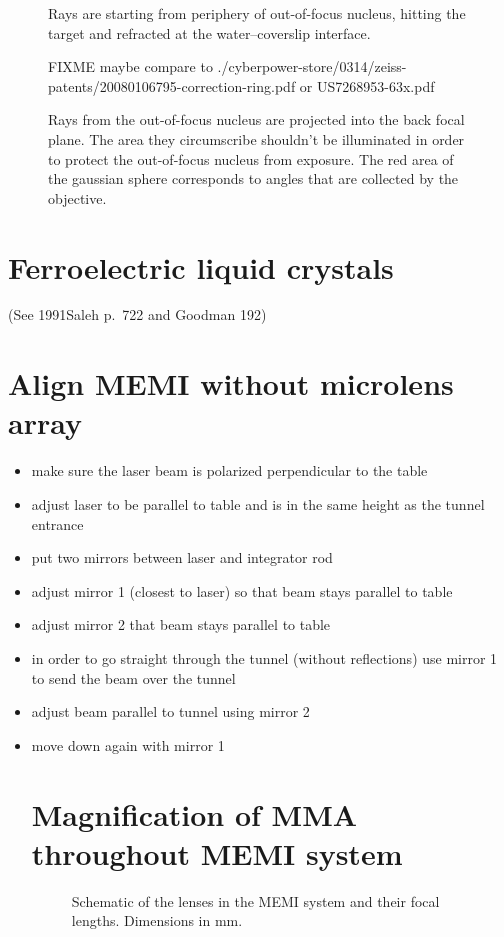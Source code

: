 \begin{figure}[!hbt]
  \centering
  \caption{Rays are starting from periphery of out-of-focus nucleus,
    hitting the target and refracted at the water--coverslip
    interface.}
\end{figure}

\begin{figure}[!hbt]
  \centering
  \caption{Rays from the out-of-focus nucleus are projected into the
    back focal plane. The area they circumscribe shouldn't be
    illuminated in order to protect the out-of-focus nucleus from
    exposure. The red area of the gaussian sphere corresponds to
    angles that are collected by the objective.}
  \label{fig:projection-schematic}

FIXME maybe compare to ./cyberpower-store/0314/zeiss-patents/20080106795-correction-ring.pdf 
or US7268953-63x.pdf

\end{figure}


\newpage
\section{Ferroelectric liquid crystals}
(See 1991Saleh p.~722 and Goodman 192)

\section{Align MEMI without microlens array}
\begin{itemize}
\item make sure the laser beam is polarized perpendicular to the table
\item adjust laser to be parallel to table and is in the same height
  as the tunnel entrance
\item put two mirrors between laser and integrator rod
\item adjust mirror 1 (closest to laser) so that beam stays parallel to table
\item adjust mirror 2 that beam stays parallel to table
\item in order to go straight through the tunnel (without reflections)
  use mirror 1 to send the beam over the tunnel
\item adjust beam parallel to tunnel using mirror 2
\item move down again with mirror 1
\section{Magnification of MMA throughout MEMI system}
\begin{figure}
   \centering
   {\tiny
   }
   \caption{Schematic of the lenses in the MEMI system and their focal
     lengths. Dimensions in mm.}
   \label{fig:aberration-sketch}
 \end{figure}

\end{itemize}
